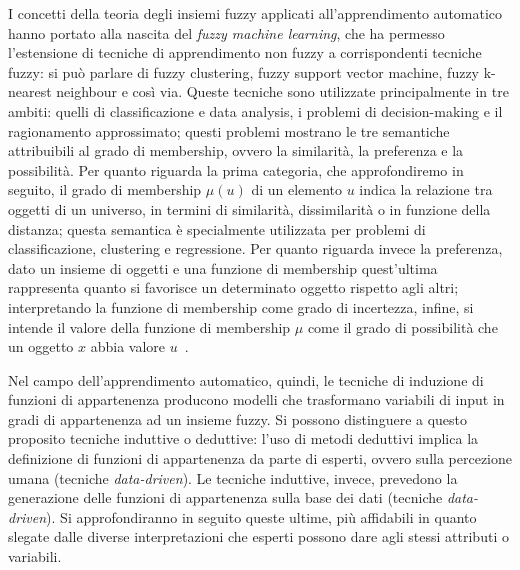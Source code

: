 \documentclass[oneside, openany]{book}
\begin{document}
		I concetti della teoria degli insiemi fuzzy applicati all'apprendimento automatico hanno portato alla nascita del \textit{fuzzy machine learning}, che ha permesso l'estensione di tecniche di apprendimento non fuzzy a corrispondenti tecniche fuzzy: si può parlare di fuzzy clustering, fuzzy support vector machine, fuzzy k-nearest neighbour e così via. Queste tecniche sono utilizzate principalmente in tre ambiti: quelli di classificazione e data analysis, i problemi di decision-making e il ragionamento approssimato; questi problemi mostrano le tre semantiche attribuibili al grado di membership, ovvero la similarità, la preferenza e la possibilità.\newline
		Per quanto riguarda la prima categoria, che approfondiremo in seguito, il grado di membership $\mu(u)$ di un elemento $u$  indica la relazione tra oggetti di un universo, in termini di similarità, dissimilarità o in funzione della distanza; questa semantica è specialmente utilizzata per problemi di classificazione, clustering e regressione. Per quanto riguarda invece la preferenza, dato un insieme di oggetti e una funzione di membership quest'ultima rappresenta quanto si favorisce un determinato oggetto rispetto agli altri; interpretando la funzione di membership come grado di incertezza, infine, si intende il valore della funzione di membership $\mu$ come il grado di possibilità che un oggetto $x$ abbia valore $u$~\cite{bib:dubois}.
		
		Nel campo dell'apprendimento automatico, quindi, le tecniche di induzione di funzioni di appartenenza producono modelli che trasformano variabili di input in gradi di appartenenza ad un insieme fuzzy. Si possono distinguere a questo proposito tecniche induttive o deduttive: l'uso di metodi deduttivi implica la definizione di funzioni di appartenenza da parte di esperti, ovvero sulla percezione umana (tecniche \textit{data-driven}). Le tecniche induttive, invece, prevedono la generazione delle funzioni di appartenenza sulla base dei dati (tecniche \textit{data-driven}). Si approfondiranno in seguito queste ultime, più affidabili in quanto slegate dalle diverse interpretazioni che esperti possono dare agli stessi attributi o variabili.
	
\end{document}
